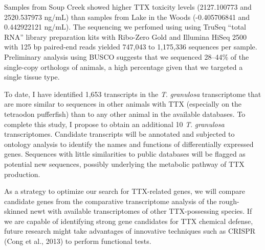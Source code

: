 Samples from Soup Creek showed higher TTX toxicity levels (2127.100773 and 2520.537973 ng/mL) than samples from Lake in the Woods (-0.405706841 and 0.442922121 ng/mL). The sequencing we perfomed using using TruSeq ``total RNA'' library preparation kits with Ribo-Zero Gold and Illumina HiSeq 2500  with 125 bp paired-end reads yielded 747,043 to 1,175,336 sequences per sample. Preliminary analysis using BUSCO suggests that we sequenced 28–44\% of the single-copy orthologs of animals, a high percentage given that we targeted a single tissue type.

To date, I have identified 1,653 transcripts in the \textit{T}. \textit{granulosa} transcriptome that are more similar to sequences in other animals with TTX (especially on the tetraodon pufferfish) than to any other animal in the available databases. To complete this study, I propose to obtain an additional 10 \textit{T}. \textit{granulosa} transcriptomes. Candidate transcripts will be annotated and subjected to ontology analysis to identify the names and functions of differentially expressed genes. Sequences with little similarities to public databases will be flagged as potential new sequences, possibly underlying the metabolic pathway of TTX production.

As a strategy to optimize our search for TTX-related genes, we will compare candidate genes from the comparative transcriptome analysis of the rough-skinned newt with available transcriptomes of other TTX-possessing species. If we are capable of identifying strong gene candidates for TTX chemical defense, future research might take advantages of innovative techniques such as CRISPR (Cong et al., 2013) to perform functional tests.
